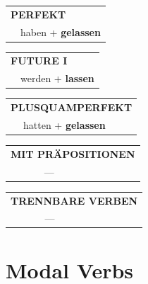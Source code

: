 \documentclass[10pt,a4paper]{revtex4-2}
\begin{document}
\begin{verbbox}
    \vspace{10pt}
 
    \begin{tabular}{rl}
     \multicolumn{2}{l}{\textbf{PERFEKT}}\\
   & haben + \textbf{gelassen}\\
  \end{tabular}
\hfill
   \begin{tabular}{rl}
   
    \multicolumn{2}{l}{\textbf{FUTURE I} }\\
    &werden + \textbf{lassen}\\
 
  \end{tabular}
\hfill
   \begin{tabular}{rl}
      \multicolumn{2}{l}{\textbf{PLUSQUAMPERFEKT}}\\
   & hatten + \textbf{gelassen}\\
  \end{tabular}
  
\vspace{10pt}

\begin{tabular}{lll}
\multicolumn{3}{l}{\textbf{MIT PRÄPOSITIONEN}}\\
& ---\\
\end{tabular}
\hfill
\begin{tabular}{lll}
\multicolumn{3}{l}{\textbf{TRENNBARE VERBEN}}\\
& ---\\
\end{tabular}

\vspace{-5pt}

\end{verbbox}

\section{Modal Verbs}
\end{document}
